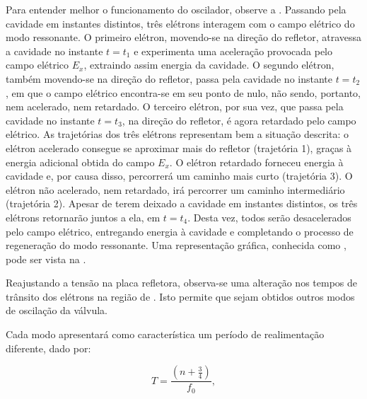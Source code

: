 \documentclass[a4paper,12pt]{article}
\begin{document}
    Para entender melhor o funcionamento do oscilador, observe a . Passando pela cavidade em instantes distintos, três elétrons interagem com o campo elétrico do modo ressonante. O primeiro elétron, movendo-se na direção do refletor, atravessa a cavidade no instante $t = t_1$ e experimenta uma aceleração provocada pelo campo elétrico $E_x$, extraindo assim energia da cavidade. O segundo elétron, também movendo-se na direção do refletor, passa pela cavidade no instante $t = t_2$, em que o campo elétrico encontra-se em seu ponto de nulo, não sendo, portanto, nem acelerado, nem retardado. O terceiro elétron, por sua vez, que passa pela cavidade no instante $t = t_3$, na direção do refletor, é agora retardado pelo campo elétrico. As trajetórias dos três elétrons representam bem a situação descrita: o elétron acelerado consegue se aproximar mais do refletor (trajetória 1), graças à energia adicional obtida do campo $E_x$. O elétron retardado forneceu energia à cavidade e, por causa disso, percorrerá um caminho mais curto (trajetória 3). O elétron não acelerado, nem retardado, irá percorrer um caminho intermediário (trajetória 2). Apesar de terem deixado a cavidade em instantes distintos, os três elétrons retornarão juntos a ela, em $t = t_4$. Desta vez, todos serão desacelerados pelo campo elétrico, entregando energia à cavidade e completando o processo de regeneração do modo ressonante. Uma representação gráfica, conhecida como , pode ser vista na .
    
    

    Reajustando a tensão na placa refletora, observa-se uma alteração nos tempos de trânsito dos elétrons na região de . Isto permite que sejam obtidos outros modos de oscilação da válvula.
    
    Cada modo apresentará como característica um período de realimentação diferente, dado por:

    \begin{equation} \label{equ:modos}
        T = \frac{\left( n + \frac{3}{4} \right)}{f_0},
    \end{equation}
\end{document}
